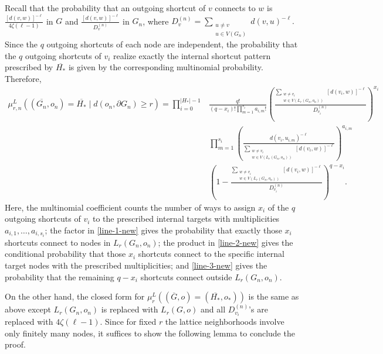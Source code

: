 \documentclass[10pt]{amsart}
\begin{document}
Recall that the probability that an outgoing shortcut of $v$ connects to $w$ is $\frac{[d(v, w)]^{-\ell}}{4\zeta(\ell-1)}$ in $G$ and $\frac{[d(v, w)]^{-\ell}}{D_{v}^{(n)}}$ in $G_n$, where
\(
D_{v}^{(n)}=\sum_{\substack{u\neq v \\ u \in V(G_n)}} d(v,u)^{-\ell}.
\)
Since the $q$ outgoing shortcuts of each node are independent, the probability that the $q$ outgoing shortcuts of $v_i$ realize exactly the internal shortcut pattern prescribed by \(\overline{H_*}\) is given by the corresponding multinomial probability. Therefore,
\begin{align}
\mu_{r, n}^L((\overline{G_n},o_n) = \overline{H_*} \mid d(o_n, \partial G_n) \geq r)
= \prod_{i =0}^{|H_*|-1}
&\frac{q!}{(q-x_i)!\prod_{m=1}^{s_i} a_{i,m}!}
\left(\frac{\sum_{\substack{w \neq v_i \\ w \in V(L_r(G_n, o_n))}} [d(v_i, w)]^{-\ell}}{D_{v_i}^{(n)}}\right)^{x_i} \label{line-1-new} \\
&\prod_{m=1}^{s_i}
\left(
\frac{d(v_i,u_{i,m})^{-\ell}}
{\sum_{\substack{w \neq v_i \\ w \in V(L_r(G_n, o_n))}} [d(v_i, w)]^{-\ell}}
\right)^{a_{i,m}} \label{line-2-new} \\
&\left(1-\frac{\sum_{\substack{w \neq v_i \\ w \in V(L_r(G_n, o_n))}} [d(v_i, w)]^{-\ell}}{D_{v_i}^{(n)}}\right)^{q-x_i}. \label{line-3-new}
\end{align}
Here, the multinomial coefficient counts the number of ways to assign \(x_i\) of the \(q\) outgoing shortcuts of \(v_i\) to the prescribed internal targets with multiplicities \(a_{i,1},\dots,a_{i,s_i}\); the factor in \eqref{line-1-new} gives the probability that exactly those \(x_i\) shortcuts connect to nodes in \(L_r(G_n,o_n)\); the product in \eqref{line-2-new} gives the conditional probability that those \(x_i\) shortcuts connect to the specific internal target nodes with the prescribed multiplicities; and \eqref{line-3-new} gives the probability that the remaining \(q-x_i\) shortcuts connect outside \(L_r(G_n,o_n)\).

On the other hand, the closed form for $\mu_{r}^L((\overline{G},o) = (\overline{H_*},o_*))$ is the same as above except $L_r(G_n, o_n)$ is replaced with $L_r(G, o)$ and all $D_{v_i}^{(n)}$'s are replaced with $4\zeta(\ell -1)$. Since for fixed $r$ the lattice neighborhoods involve only finitely many nodes, it suffices to show the following lemma to conclude the proof. 
\end{document}
